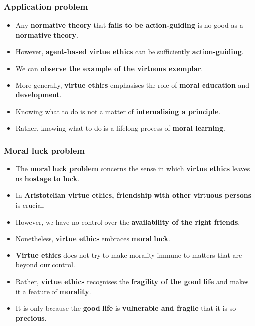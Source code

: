 \documentclass[11pt]{article}
\begin{document}
\subsubsection{Application problem}
\label{sec:orgddb7bc6}
\begin{itemize}
\item Any \textbf{normative theory} that \textbf{fails to be action-guiding} is no good as a \textbf{normative theory}.
\item However, \textbf{agent-based virtue ethics} can be sufficiently \textbf{action-guiding}.
\item We can \textbf{observe the example of the virtuous exemplar}.
\item More generally, \textbf{virtue ethics} emphasises the role of \textbf{moral education} and \textbf{development}.
\item Knowing what to do is not a matter of \textbf{internalising a principle}.
\item Rather, knowing what to do is a lifelong process of \textbf{moral learning}.
\end{itemize}
\subsubsection{Moral luck problem}
\label{sec:orgf10b3e9}
\begin{itemize}
\item The \textbf{moral luck problem} concerns the sense in which \textbf{virtue ethics} leaves us \textbf{hostage to luck}.
\item In \textbf{Aristotelian virtue ethics, friendship with other virtuous persons} is crucial.
\item However, we have no control over the \textbf{availability of the right friends}.
\item Nonetheless, \textbf{virtue ethics} embraces \textbf{moral luck}.
\item \textbf{Virtue ethics} does not try to make morality immune to matters that are beyond our control.
\item Rather, \textbf{virtue ethics} recognises the \textbf{fragility of the good life} and makes it a feature of \textbf{morality}.
\item It is only because the \textbf{good life} is \textbf{vulnerable and fragile} that it is so \textbf{precious}.
\end{itemize}

 \newpage
\end{document}
